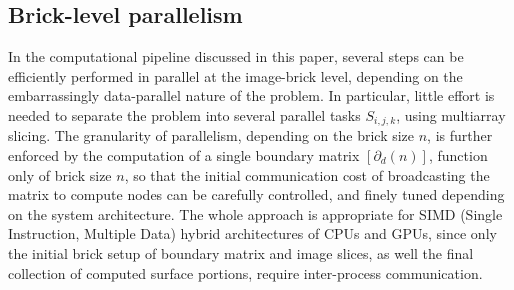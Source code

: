 %
%
%
%


\subsection{Brick-level parallelism}\label{sec:brick-parallelism}
In the computational pipeline discussed in this paper, several steps can be efficiently performed in parallel at the image-brick level, depending on the embarrassingly data-parallel nature of the problem. In particular, little effort is needed to separate the problem into several  parallel tasks $S_{i,j,k}$, using multiarray slicing. The granularity of parallelism, depending on the brick size $n$, is further enforced by the computation of a single boundary matrix $[\partial_d(n)]$, function only of brick size $n$, so that the initial communication cost of broadcasting the matrix to compute nodes can be carefully controlled, and finely tuned depending on the system architecture. The whole approach is appropriate  for SIMD (Single Instruction, Multiple Data) hybrid architectures of CPUs and GPUs, since only the initial brick setup of boundary matrix and image slices, as well the final collection of computed surface portions, require inter-process communication.